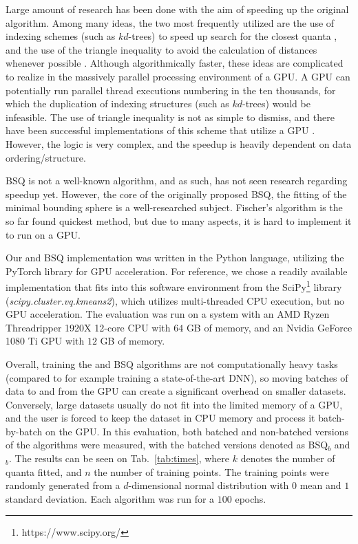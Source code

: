 			Large amount of research has been done with the aim of speeding up the original \kmeans{} algorithm.
			Among many ideas, the two most frequently utilized are the use of indexing schemes (such as $kd$-trees) to speed up search for the closest quanta \cite{kmeansKD}, and the use of the triangle inequality to avoid the calculation of distances whenever possible \cite{kmeansFaster, kmeansTriangle}.
			Although algorithmically faster, these ideas are complicated to realize in the massively parallel processing environment of a \ac{GPU}.
			A \ac{GPU} can potentially run parallel thread executions numbering in the ten thousands, for which the duplication of indexing structures (such as $kd$-trees) would be infeasible.
			The use of triangle inequality is not as simple to dismiss, and there have been successful implementations of this scheme that utilize a \ac{GPU} \cite{kmeansCuda}.
			However, the logic is very complex, and the speedup is heavily dependent on data ordering/structure.
			
			\ac{BSQ} is not a well-known algorithm, and as such, has not seen research regarding speedup yet.
			However, the core of the originally proposed \ac{BSQ}, the fitting of the minimal bounding sphere is a well-researched subject.
			Fischer's algorithm \cite{fischer} is the so far found quickest method, but due to many aspects, it is hard to implement it to run on a \ac{GPU}.
			
			Our \kmeans{} and \ac{BSQ} implementation was written in the Python language, utilizing the PyTorch library for \ac{GPU} acceleration.
			For reference, we chose a readily available \kmeans{} implementation that fits into this software environment from the SciPy\footnote{https://www.scipy.org/} library (\textit{scipy.cluster.vq.kmeans2}), which utilizes multi-threaded \ac{CPU} execution, but no \ac{GPU} acceleration.
			The evaluation was run on a system with an AMD Ryzen Threadripper 1920X 12-core \ac{CPU} with $64$ GB of memory, and an Nvidia GeForce 1080 Ti \ac{GPU} with $12$ GB of memory.
			
			Overall, training the \kmeans{} and \ac{BSQ} algorithms are not computationally heavy tasks (compared to for example training a state-of-the-art \ac{DNN}), so moving batches of data to and from the \ac{GPU} can create a significant overhead on smaller datasets.
			Conversely, large datasets usually do not fit into the limited memory of a \ac{GPU}, and the user is forced to keep the dataset in \ac{CPU} memory and process it batch-by-batch on the \ac{GPU}.
			In this evaluation, both batched and non-batched versions of the algorithms were measured, with the batched versions denoted as \ac{BSQ}$_b$ and \kmeans{}$_b$.
			The results can be seen on Tab.~\ref{tab:times}, where $k$ denotes the number of quanta fitted, and $n$ the number of training points.
			The training points were randomly generated from a $d$-dimensional normal distribution with $0$ mean and $1$ standard deviation.
			Each algorithm was run for a $100$ epochs.
			
